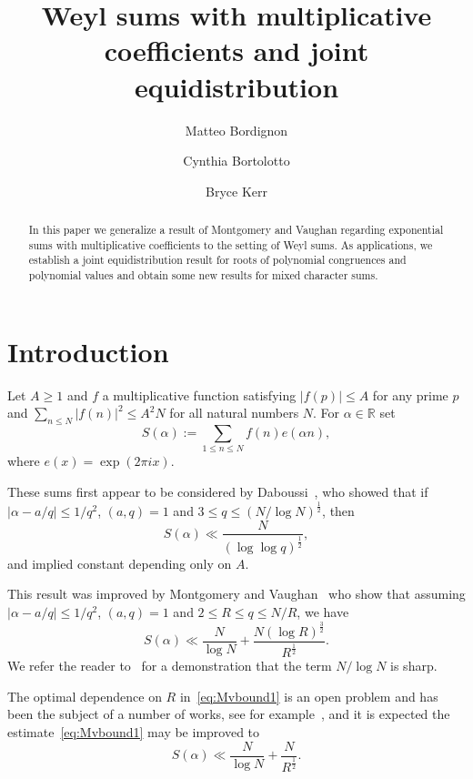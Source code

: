 \documentclass[12pt]{amsart}
\title[Weyl sums with multiplicative coefficients]{Weyl sums with multiplicative coefficients and joint equidistribution}
\author{Matteo Bordignon  }
\author{Cynthia Bortolotto  }
\author{Bryce Kerr  }
\def\le{\leqslant}
\def\ge{\geqslant}
\begin{document}
 
\begin{abstract} 
In this paper we generalize a result of Montgomery and Vaughan regarding exponential sums with multiplicative coefficients to the setting of Weyl sums.  As applications, we establish a joint equidistribution result for roots of polynomial congruences and polynomial values and obtain some new results for mixed character sums. 
 \end{abstract}
\maketitle

\tableofcontents
\section{Introduction}
Let $A\ge 1$ and $f$ a multiplicative function satisfying $|f(p)| \le A$ for any prime $p$ and $\sum_{n\leq N} |f(n)|^2 \le A^2 N$ for all natural numbers $N$. For $\alpha \in \mathbb{R}$ set
\begin{equation*}
S(\alpha):= \sum_{1\le n \le N} f(n)e(\alpha n),
\end{equation*}
where  $e(x)= \exp(2\pi i x)$.

These sums first appear to be considered by Daboussi~\cite{Dab}, who showed that if $|\alpha-a/q| \le 1/q^2$, $(a,q)=1$ and $ 3 \le q \le (N/\log N)^{\frac{1}{2}}$, then
\begin{equation*}
S(\alpha)\ll \frac{N}{(\log \log q)^{\frac{1}{2}}},
\end{equation*}
and implied constant depending only on $A$.

This result was improved  by Montgomery and Vaughan~\cite[Corollary~1]{M-V} who show that assuming $|\alpha-a/q| \le 1/q^2$, $(a,q)=1$ and $2 \le R \le q \le N/R$, we have 
\begin{equation}
\label{eq:Mvbound1}
S(\alpha)\ll \frac{N}{\log N}+ \frac{N(\log R)^{\frac{3}{2}}}{R^{\frac{1}{2}}}.
\end{equation}
We refer the reader to~\cite[Section~7]{M-V} for a demonstration that the term $N/\log{N}$ is sharp. 

The optimal dependence on $R$ in~\eqref{eq:Mvbound1} is an open problem and has been the subject of a number of works, see for example~\cite{Bach,Bre}, and it is expected the estimate~\eqref{eq:Mvbound1} may be improved to
\begin{equation}
\label{eq:Mvbound2}
S(\alpha)\ll \frac{N}{\log N}+ \frac{N}{R^{\frac{1}{2}}}.
\end{equation}
\end{document}
